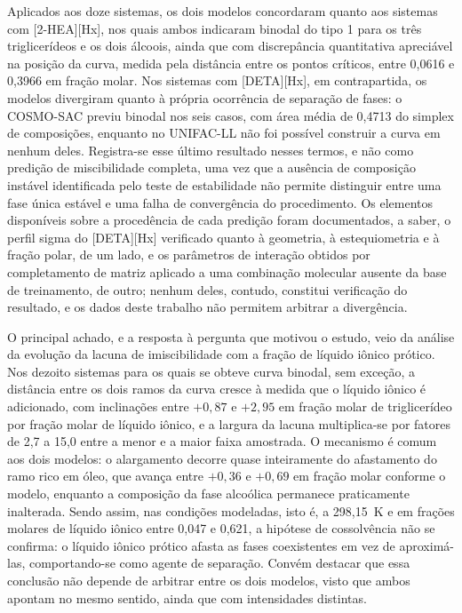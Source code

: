 Aplicados aos doze sistemas, os dois modelos concordaram quanto aos sistemas com [2-HEA][Hx], nos quais ambos indicaram binodal do tipo 1 para os três triglicerídeos e os dois álcoois, ainda que com discrepância quantitativa apreciável na posição da curva, medida pela distância entre os pontos críticos, entre 0,0616 e 0,3966 em fração molar. Nos sistemas com [DETA][Hx], em contrapartida, os modelos divergiram quanto à própria ocorrência de separação de fases: o COSMO-SAC previu binodal nos seis casos, com área média de 0,4713 do simplex de composições, enquanto no UNIFAC-LL não foi possível construir a curva em nenhum deles. Registra-se esse último resultado nesses termos, e não como predição de miscibilidade completa, uma vez que a ausência de composição instável identificada pelo teste de estabilidade não permite distinguir entre uma fase única estável e uma falha de convergência do procedimento. Os elementos disponíveis sobre a procedência de cada predição foram documentados, a saber, o perfil sigma do [DETA][Hx] verificado quanto à geometria, à estequiometria e à fração polar, de um lado, e os parâmetros de interação obtidos por completamento de matriz aplicado a uma combinação molecular ausente da base de treinamento, de outro; nenhum deles, contudo, constitui verificação do resultado, e os dados deste trabalho não permitem arbitrar a divergência.

O principal achado, e a resposta à pergunta que motivou o estudo, veio da análise da evolução da lacuna de imiscibilidade com a fração de líquido iônico prótico. Nos dezoito sistemas para os quais se obteve curva binodal, sem exceção, a distância entre os dois ramos da curva cresce à medida que o líquido iônico é adicionado, com inclinações entre $+0{,}87$ e $+2{,}95$ em fração molar de triglicerídeo por fração molar de líquido iônico, e a largura da lacuna multiplica-se por fatores de 2,7 a 15,0 entre a menor e a maior faixa amostrada. O mecanismo é comum aos dois modelos: o alargamento decorre quase inteiramente do afastamento do ramo rico em óleo, que avança entre $+0{,}36$ e $+0{,}69$ em fração molar conforme o modelo, enquanto a composição da fase alcoólica permanece praticamente inalterada. Sendo assim, nas condições modeladas, isto é, a 298,15~K e em frações molares de líquido iônico entre 0,047 e 0,621, a hipótese de cossolvência não se confirma: o líquido iônico prótico afasta as fases coexistentes em vez de aproximá-las, comportando-se como agente de separação. Convém destacar que essa conclusão não depende de arbitrar entre os dois modelos, visto que ambos apontam no mesmo sentido, ainda que com intensidades distintas.

